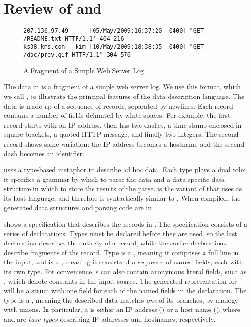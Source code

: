 \section{Review of \pads{} and \learnpads{}}\label{sec:review}
\begin{figure*}
{\small
\begin{verbatim}
207.136.97.49  - - [05/May/2009:16:37:20 -0400] "GET /README.txt HTTP/1.1" 404 216
ks38.kms.com - kim [10/May/2009:18:38:35 -0400] "GET /doc/prev.gif HTTP/1.1" 304 576
\end{verbatim}
}
\caption{A Fragment of a Simple Web Server Log \ai{}}
\label{fig:ai} 
\end{figure*}

The data in  is a fragment of a simple web server log.
We use this format, which we call
\ai{}, to illustrate the principal features of the \pads{} data
description language. The data 
is made up of a sequence of records, separated by newlines.
Each record contains a number of fields delimited by white spaces. 
For example, the first record starts with an IP address, 
then has two dashes, a time stamp enclosed in
square brackets, a quoted HTTP message, and finally two
integers. The second record shows some variation:
the IP address becomes a hostname and the second dash becomes an identifier.

\pads{} uses a type-based metaphor to
describe ad hoc data.  Each \pads{} type plays a dual role: it
specifies a grammar by which to parse the data and a data-specific
data structure in which to store the results of the parse. 
\padsc{} is the variant of \pads{} that uses \C{} as its host
language, and therefore is syntactically similar to \C{}. 
When compiled, the generated data structures and parsing code 
are in \C{}.

 shows a \padsc{} specification that describes the
records in .  
The specification consists of a
series of declarations. Types must be declared before they are used,
so the last declaration  describes the entirety of a
record, while the earlier declarations describe fragments of the record.  
Type  is a , meaning it comprises a full line in
the input, and is a , meaning it consists of a sequence of
named fields, each with its own type.  For convenience, s
can also contain anonymous literal fields, such as \cd{" ["}, which
denote constants in the input source.  The generated representation
for  will be a \C{} struct with one field for each of the
named fields in the declaration.
The type  is a , meaning the described data
matches \textit{one} of its branches, by analogy with \C{} unions. In
particular, a  is either an IP address () or a
host name (), where  and  are
\padsc{} \textit{base types} describing IP addresses and hostnames,
respectively.  

